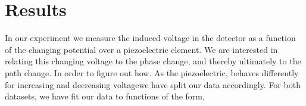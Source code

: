 \documentclass[working, oneside]{inputs/tuftebook}
\begin{document}
\section*{Results}
In our experiment we measure the induced voltage in the detector as a function of the changing potential over a piezoelectric element. We are interested in relating this changing voltage to the phase change, and thereby ultimately to the path change. In order to figure out how. As the piezoelectric, behaves differently for increasing and decreasing voltagewe have split our data accordingly. For both datasets, we have fit our data to functions of the form,
\end{document}
